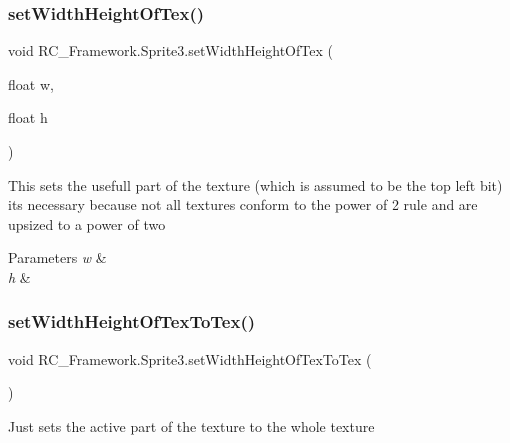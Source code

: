 \subsubsection{\texorpdfstring{set\+Width\+Height\+Of\+Tex()}{setWidthHeightOfTex()}}
{\footnotesize\ttfamily void R\+C\+\_\+\+Framework.\+Sprite3.\+set\+Width\+Height\+Of\+Tex (\begin{DoxyParamCaption}\item[{float}]{w,  }\item[{float}]{h }\end{DoxyParamCaption})}



This sets the usefull part of the texture (which is assumed to be the top left bit) its necessary because not all textures conform to the power of 2 rule and are upsized to a power of two 


\begin{DoxyParams}{Parameters}
{\em w} & \\
\hline
{\em h} & \\
\hline
\end{DoxyParams}
\mbox{\label{class_r_c___framework_1_1_sprite3_ad1f6bebc12d9d8f9bdf4ba13f3907bc3}} 
\subsubsection{\texorpdfstring{set\+Width\+Height\+Of\+Tex\+To\+Tex()}{setWidthHeightOfTexToTex()}}
{\footnotesize\ttfamily void R\+C\+\_\+\+Framework.\+Sprite3.\+set\+Width\+Height\+Of\+Tex\+To\+Tex (\begin{DoxyParamCaption}{ }\end{DoxyParamCaption})}



Just sets the active part of the texture to the whole texture 

\mbox{\label{class_r_c___framework_1_1_sprite3_a05dbc29987c0c2552cb69e81ea3fcdab}} 
